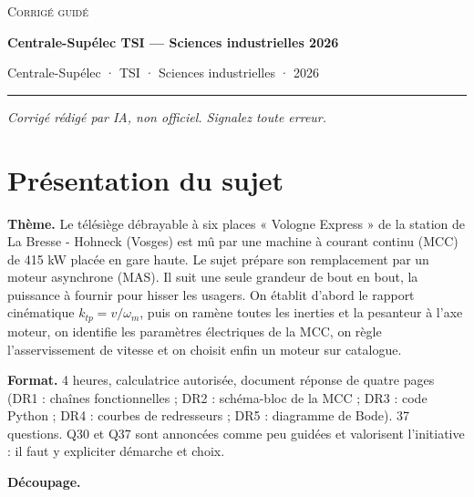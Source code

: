 \documentclass[11pt,a4paper]{article}
\begin{document}
\thispagestyle{plain}
\begin{center}
  {\small\scshape Corrigé guidé}\par\smallskip
  {\LARGE\bfseries Centrale-Supélec TSI — Sciences industrielles 2026\par}\medskip
  {\large Centrale-Supélec · TSI · Sciences industrielles · 2026\par}
\end{center}
\vspace{2pt}\hrule\vspace{8pt}

\emph{Corrigé rédigé par IA, non officiel. Signalez toute erreur.}

\hypertarget{pruxe9sentation-du-sujet}{%
\section{Présentation du sujet}\label{pruxe9sentation-du-sujet}}

\textbf{Thème.} Le télésiège débrayable à six places « Vologne Express » de la station de La Bresse - Hohneck (Vosges) est mû par une machine à courant continu (MCC) de 415 kW placée en gare haute. Le sujet prépare son remplacement par un moteur asynchrone (MAS). Il suit une seule grandeur de bout en bout, la puissance à fournir pour hisser les usagers. On établit d'abord le rapport cinématique \(k_{tp}=v/\omega_m\), puis on ramène toutes les inerties et la pesanteur à l'axe moteur, on identifie les paramètres électriques de la MCC, on règle l'asservissement de vitesse et on choisit enfin un moteur sur catalogue.

\textbf{Format.} 4 heures, calculatrice autorisée, document réponse de quatre pages (DR1 : chaînes fonctionnelles ; DR2 : schéma-bloc de la MCC ; DR3 : code Python ; DR4 : courbes de redresseurs ; DR5 : diagramme de Bode). 37 questions. Q30 et Q37 sont annoncées comme peu guidées et valorisent l'initiative : il faut y expliciter démarche et choix.

\textbf{Découpage.}
\end{document}
